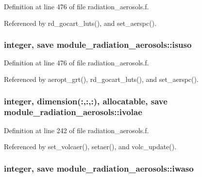 Definition at line 476 of file radiation\+\_\+aerosols.\+f.



Referenced by rd\+\_\+gocart\+\_\+luts(), and set\+\_\+aerspc().

\subsubsection[{\texorpdfstring{isuso}{isuso}}]{\setlength{\rightskip}{0pt plus 5cm}integer, save module\+\_\+radiation\+\_\+aerosols\+::isuso\hspace{0.3cm}{\ttfamily [private]}}\hypertarget{namespacemodule__radiation__aerosols_acddb4dccea82201fd3b193c15c85ec78}{}\label{namespacemodule__radiation__aerosols_acddb4dccea82201fd3b193c15c85ec78}


Definition at line 476 of file radiation\+\_\+aerosols.\+f.



Referenced by aeropt\+\_\+grt(), rd\+\_\+gocart\+\_\+luts(), and set\+\_\+aerspc().

\subsubsection[{\texorpdfstring{ivolae}{ivolae}}]{\setlength{\rightskip}{0pt plus 5cm}integer, dimension(\+:,\+:,\+:), allocatable, save module\+\_\+radiation\+\_\+aerosols\+::ivolae\hspace{0.3cm}{\ttfamily [private]}}\hypertarget{namespacemodule__radiation__aerosols_ab016f51c81a1157ee234dc82f8f114ee}{}\label{namespacemodule__radiation__aerosols_ab016f51c81a1157ee234dc82f8f114ee}


Definition at line 242 of file radiation\+\_\+aerosols.\+f.



Referenced by set\+\_\+volcaer(), setaer(), and volc\+\_\+update().

\subsubsection[{\texorpdfstring{iwaso}{iwaso}}]{\setlength{\rightskip}{0pt plus 5cm}integer, save module\+\_\+radiation\+\_\+aerosols\+::iwaso\hspace{0.3cm}{\ttfamily [private]}}\hypertarget{namespacemodule__radiation__aerosols_ad15292f4a185c28ad44687d95ef4d3a4}{}\label{namespacemodule__radiation__aerosols_ad15292f4a185c28ad44687d95ef4d3a4}


